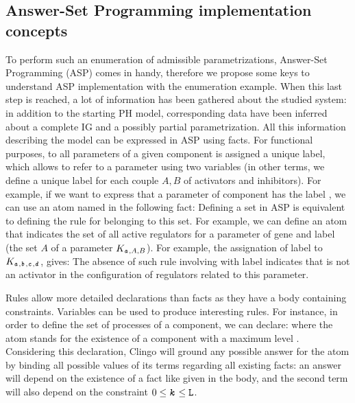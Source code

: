 \subsection{Answer-Set Programming implementation concepts}
To perform such an enumeration of admissible parametrizations, Answer-Set Programming (ASP) comes in handy, therefore we propose some keys to understand ASP implementation with the enumeration example. When this last step is reached, a lot of information has been gathered about the studied system: in addition to the starting PH model, corresponding data have been inferred about a complete IG and a possibly partial parametrization.
All this information describing the model can be expressed in ASP using facts.
For functional purposes, to all parameters of a given component is assigned a unique label, which allows to refer to a parameter using two variables (in other terms, we define a unique label for each couple $A,B$ of activators and inhibitors). For example, if we want to express that a parameter of component  has the label , we can use an atom named  in the following fact:
Defining a set in ASP is equivalent to defining the rule for belonging to this set. For example, we can define an atom  that indicates the set of all active regulators for a parameter of gene  and label  (\ie the set $A$ of a parameter $K_{\texttt{\textit{a}},A,B}$). For example, the assignation of label  to $K_{\texttt{\textit{a}},{\texttt{\textit{b}},\texttt{\textit{c}}},{\texttt{\textit{d}}}}$, gives:
The absence of such rule involving  with label  indicates that  is not an activator in the configuration of regulators related to this parameter.

Rules allow more detailed declarations than facts as they have a body containing constraints. Variables can be used to produce interesting rules.
For instance, in order to define the set of processes of a component, we can declare:
where the  atom stands for the existence of a component  with a maximum level .
Considering this declaration, Clingo will ground any possible answer for the atom  by binding all possible values of its terms regarding all existing facts: an answer  will depend on the existence of a fact like given in the body, and the second term will also depend on the constraint $0 \leq \texttt{\textit{k}} \leq \texttt{L}$.

